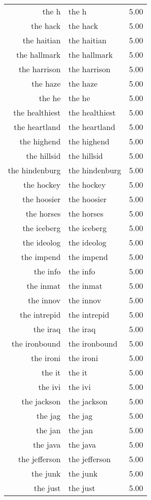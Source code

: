 \begin{table}[ht]
\begin{tabular}{rlr}
  the h & the h & 5.00 \\ 
  the hack & the hack & 5.00 \\ 
  the haitian & the haitian & 5.00 \\ 
  the hallmark & the hallmark & 5.00 \\ 
  the harrison & the harrison & 5.00 \\ 
  the haze & the haze & 5.00 \\ 
  the he & the he & 5.00 \\ 
  the healthiest & the healthiest & 5.00 \\ 
  the heartland & the heartland & 5.00 \\ 
  the highend & the highend & 5.00 \\ 
  the hillsid & the hillsid & 5.00 \\ 
  the hindenburg & the hindenburg & 5.00 \\ 
  the hockey & the hockey & 5.00 \\ 
  the hoosier & the hoosier & 5.00 \\ 
  the horses & the horses & 5.00 \\ 
  the iceberg & the iceberg & 5.00 \\ 
  the ideolog & the ideolog & 5.00 \\ 
  the impend & the impend & 5.00 \\ 
  the info & the info & 5.00 \\ 
  the inmat & the inmat & 5.00 \\ 
  the innov & the innov & 5.00 \\ 
  the intrepid & the intrepid & 5.00 \\ 
  the iraq & the iraq & 5.00 \\ 
  the ironbound & the ironbound & 5.00 \\ 
  the ironi & the ironi & 5.00 \\ 
  the it & the it & 5.00 \\ 
  the ivi & the ivi & 5.00 \\ 
  the jackson & the jackson & 5.00 \\ 
  the jag & the jag & 5.00 \\ 
  the jan & the jan & 5.00 \\ 
  the java & the java & 5.00 \\ 
  the jefferson & the jefferson & 5.00 \\ 
  the junk & the junk & 5.00 \\ 
  the just & the just & 5.00 \\ 

\end{tabular}
\end{table}
